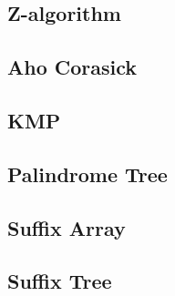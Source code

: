 \subsection{Z-algorithm}
\raggedbottom
\subsection{Aho Corasick}
\raggedbottom
\subsection{KMP}
\raggedbottom
\subsection{Palindrome Tree}
\raggedbottom
\subsection{Suffix Array}
\raggedbottom
\subsection{Suffix Tree}
\raggedbottom

